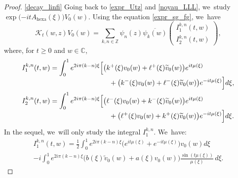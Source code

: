 \documentclass[JEP,XML,SOM,Unicode,NoFloatCountersInSection,published]{cedram}
\theoremstyle{definition}
\let\EE\exp
\let\ov\overline
\newcommand\C{\mathbb C}
\newcommand\Z{\mathbb Z}
\newcommand{\bpa}[1]{\bigl(#1\bigr)}
\begin{document}
\skpt
\begin{proof}
\eqref{decay_linfi}
Going back to \eqref{expr_Utz} and \eqref{noyau_LLL}, we~study $\EE\bigl({-itA_{\mathrm{hexa}}(\xi) }\bigr)V_0(w)$. Using the equation \eqref{expr_sg_fg}, we~have\vspace*{-3pt}
\begin{equation*}
\mathcal{K}_t(w,z)V_0(w) = \sum_{k,n\in\Z}\psi_n(z) \ov{\psi_k(w)} \begin{pmatrix} I_1^{k,n}(t,w) \\[2pt] I_2^{k,n}(t,w) \end{pmatrix},
\end{equation*}
where, for $t \geq 0$ and $w \in \C$,\vspace*{-3pt}
\begin{align*}
I_1^{k,n}(t,w) &= \int_0^1 e^{ {2i\pi(k-n)} \xi}\Big[\bigl(k^+(\xi)v_0(w)+ \ell^+(\xi)\widetilde{v}_0(w)\bigr)e^{it\mu(\xi)}\\[-3pt]
&\hspace*{3cm}+\bigl(k^-(\xi)v_0(w)+ \ell^-(\xi)\widetilde{v}_0(w)\bigr)e^{-it\mu(\xi)}\Big]d\xi,
\\
I_2^{k,n}(t,w) &= \int_0^1 e^{ {2i\pi(k-n)} \xi}\Big[\bigl(\ell^-(\xi)v_0(w)+ k^-(\xi)\widetilde{v}_0(w)\bigr)e^{it\mu(\xi)}\\[-3pt]
&\hspace*{3cm}+ \bigl(\ell^+(\xi)v_0(w)+ k^+(\xi)\widetilde{v}_0(w)\bigr) e^{-it\mu(\xi)}\Big]d\xi.
\end{align*}
In the sequel, we~will only study the integral $I_1^{k,n}$. We~have:
\begin{multline*}
I_1^{k,n}(t,w) = \frac{1}{2}\int_0^1 e^{2i\pi(k-n)\xi}\bpa{e^{it\mu(\xi)}+e^{-it\mu(\xi)}}v_0(w) d\xi \\
- i \int_0^1 e^{{2i\pi(k-n)}\xi}\bigl(b(\xi)\widetilde{v}_0(w)+a(\xi)v_0(w)\bigr) \frac{\sin(t\mu(\xi))}{\mu(\xi)}\, d\xi.
\end{multline*}


\end{proof}
\end{document}

